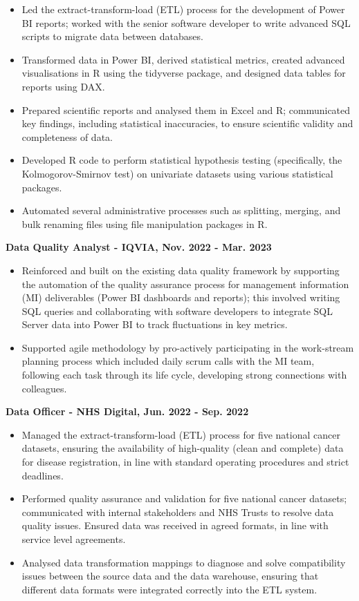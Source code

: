 \documentclass[10pt,a4paper]{article}
\begin{document}
\begin{itemize}[leftmargin=*,align=left]
\normalfont
\item Led the extract-transform-load (ETL) process for the development of Power BI reports; worked with the senior software developer to write advanced SQL scripts to migrate data between databases.
\item Transformed data in Power BI, derived statistical metrics, created advanced visualisations in R using the tidyverse package, and designed data tables for reports using DAX.
\item Prepared scientific reports and analysed them in Excel and R; communicated key findings, including statistical inaccuracies, to ensure scientific validity and completeness of data.
\item Developed R code to perform statistical hypothesis testing (specifically, the Kolmogorov-Smirnov test) on univariate datasets using various statistical packages.
\item Automated several administrative processes such as splitting, merging, and bulk renaming files using file manipulation packages in R.
\end{itemize}

\noindent \bf Data Quality Analyst - IQVIA, Nov. 2022 - Mar. 2023

\begin{itemize}[leftmargin=*,align=left]
\normalfont
\item Reinforced and built on the existing data quality framework by supporting the automation of the quality assurance process for management information (MI) deliverables (Power BI dashboards and reports); this involved writing SQL queries and collaborating with software developers to integrate SQL Server data into Power BI to track fluctuations in key metrics.
\item Supported agile methodology by pro-actively participating in the work-stream planning process which included daily scrum calls with the MI team, following each task through its life cycle, developing strong connections with colleagues.
\end{itemize}
\newpage
\noindent \bf Data Officer - NHS Digital, Jun. 2022 - Sep. 2022

\begin{itemize}[leftmargin=*,align=left]
\normalfont
\item Managed the extract-transform-load (ETL) process for five national cancer datasets, ensuring the availability of high-quality (clean and complete) data for disease registration, in line with standard operating procedures and strict deadlines.
\item Performed quality assurance and validation for five national cancer datasets; communicated with internal stakeholders and NHS Trusts to resolve data quality issues. Ensured data was received in agreed formats, in line with service level agreements.
\item Analysed data transformation mappings to diagnose and solve compatibility issues between the source data and the data warehouse, ensuring that different data formats were integrated correctly into the ETL system.
\end{itemize}
\end{document}

